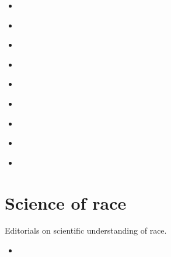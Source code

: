 \documentclass[letterpaper,10pt,english]{jupyterBook}
\begin{document}
\begin{itemize}
\begin{itemize}
\item {} 
\sphinxAtStartPar
{\hyperref[\detokenize{Volumes/40/02/our_rate_of_increase::doc}]{}}

\item {} 
\sphinxAtStartPar
{\hyperref[\detokenize{Volumes/40/02/our_health::doc}]{}}

\item {} 
\sphinxAtStartPar
{\hyperref[\detokenize{Volumes/40/02/its_a_girl::doc}]{}}

\item {} 
\sphinxAtStartPar
{\hyperref[\detokenize{Volumes/40/02/dodging_the_issue::doc}]{}}

\item {} 
\sphinxAtStartPar
{\hyperref[\detokenize{Volumes/40/10/church_and_religion::doc}]{}}

\item {} 
\sphinxAtStartPar
{\hyperref[\detokenize{Volumes/40/11/panafrica_and_new_racial_philosophy::doc}]{}}

\item {} 
\sphinxAtStartPar
{\hyperref[\detokenize{Volumes/40/12/matter_of_manners::doc}]{}}

\item {} 
\sphinxAtStartPar
{\hyperref[\detokenize{Volumes/40/12/peace::doc}]{}}

\item {} 
\sphinxAtStartPar
{\hyperref[\detokenize{Volumes/41/01/scottsboro::doc}]{}}

\end{itemize}

\end{itemize}


\section{Science of race}
\label{\detokenize{Sections/racescience:science-of-race}}\label{\detokenize{Sections/racescience::doc}}
\sphinxAtStartPar
Editorials on scientific understanding of race.
\begin{itemize}
\item {} 
\sphinxAtStartPar
{\hyperref[\detokenize{Volumes/02/04/races::doc}]{}}

\end{itemize}
\end{document}
